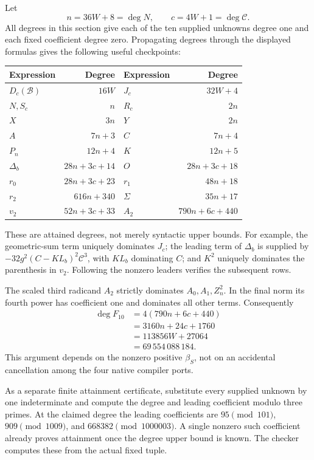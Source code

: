 \documentclass[11pt,letterpaper]{article}
\newcommand{\B}{\mathcal B}
\newcommand{\capc}{\mathscr C}
\theoremstyle{remark}
\begin{document}
Let
\[
n=36W+8=\deg N,\qquad c=4W+1=\deg\capc.
\]
All degrees in this section give each of the ten supplied unknowns
degree one and each fixed coefficient degree zero. Propagating degrees
through the displayed formulas gives the following useful checkpoints:
\begin{center}
\small
\begin{tabular}{@{}lr@{\qquad}lr@{}}
\toprule
Expression & Degree & Expression & Degree\\
\midrule
\(D_c(\B)\) & \(16W\) & \(J_c\) & \(32W+4\)\\
\(N,S_c\) & \(n\) & \(R_c\) & \(2n\)\\
\(X\) & \(3n\) & \(Y\) & \(2n\)\\
\(A\) & \(7n+3\) & \(C\) & \(7n+4\)\\
\(P_n\) & \(12n+4\) & \(K\) & \(12n+5\)\\
\(\Delta_b\) & \(28n+3c+14\) &
\(O\) & \(28n+3c+18\)\\
\(r_0\) & \(28n+3c+23\) &
\(r_1\) & \(48n+18\)\\
\(r_2\) & \(616n+340\) &
\(\Sigma\) & \(35n+17\)\\
\(v_2\) & \(52n+3c+33\) &
\(A_2\) & \(790n+6c+440\)\\
\bottomrule
\end{tabular}
\end{center}
These are attained degrees, not merely syntactic upper bounds.
For example, the geometric-sum term uniquely dominates \(J_c\);
the leading term of \(\Delta_b\) is supplied by
\(-32g^2(C-KL_b)^2\capc^3\), with \(KL_b\) dominating \(C\);
and \(K^2\) uniquely dominates the parenthesis in \(v_2\).
Following the nonzero leaders verifies the subsequent rows.

The scaled third radicand \(A_2\) strictly dominates \(A_0,A_1,Z_n^2\).
In the final norm its fourth power has coefficient one and dominates
all other terms. Consequently
\begin{align*}
\deg F_{10}
 &=4(790n+6c+440)\\
 &=3160n+24c+1760\\
 &=113856W+27064\\
 &=\boxed{69\,554\,088\,184}.
\end{align*}
This argument depends on the nonzero positive \(\beta_S\), not on
an accidental cancellation among the four native compiler ports.

As a separate finite attainment certificate, substitute every supplied
unknown by one indeterminate and compute the degree and leading
coefficient modulo three primes. At the claimed degree the leading
coefficients are \(95\pmod{101}\), \(909\pmod{1009}\), and
\(668382\pmod{1000003}\). A single nonzero such coefficient already
proves attainment once the degree upper bound is known. The checker
computes these from the actual fixed tuple.
\end{document}
